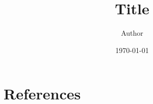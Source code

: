 \documentclass[11pt]{beamer}
\title[Short Title]{Title}
\author[Short Author]{Author}
\date{\today}
\begin{document}

\begin{frame}
    \maketitle
\end{frame}

\begin{frame}
    \tableofcontents
\end{frame}

\section*{References}
\nocite{*}
\begin{frame}


\end{frame}
\end{document}
